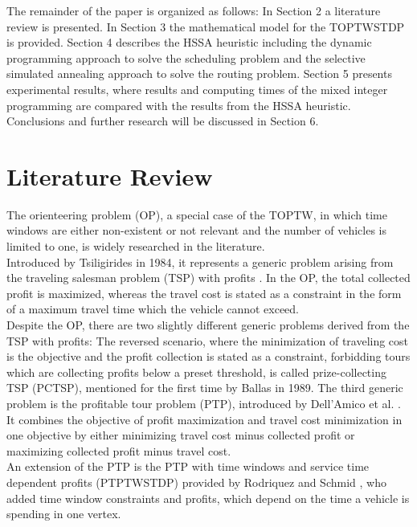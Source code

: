 \documentclass[final,5p,times,twocolumn]{elsarticle}
\begin{document}
The remainder of the paper is organized as follows: In Section 2 a literature review is presented. In Section 3 the mathematical model for the TOPTWSTDP is provided. Section 4 describes the HSSA heuristic including the dynamic programming approach to solve the scheduling problem and the selective simulated annealing approach to solve the routing problem. Section 5 presents experimental results, where results and computing times of the mixed integer programming are compared with the results from the HSSA heuristic. Conclusions and further research will be discussed in Section 6. \\

\section{Literature Review}
The orienteering problem (OP), a special case of the TOPTW, in which time windows are either non-existent or not relevant and the number of vehicles is limited to one, is widely researched in the literature. \\
Introduced by Tsiligirides \cite{Tsiligirides:1984hmao} in 1984, it represents a generic problem arising from the traveling salesman problem (TSP) with profits \cite{Feillet:2005tspwp}. In the OP, the total collected profit is maximized, whereas the travel cost is stated as a constraint in the form of a maximum travel time which the vehicle cannot exceed. \\
Despite the OP, there are two slightly different generic problems derived from the TSP with profits: The reversed scenario, where the minimization of traveling cost is the objective and the profit collection is stated as a constraint, forbidding tours which are collecting profits below a preset threshold, is called prize-collecting TSP (PCTSP), mentioned for the first time by Ballas \cite{Ballas:1989pctsp} in 1989. The third generic problem is the profitable tour problem (PTP), introduced by Dell'Amico et al. \cite{DellAmico:1995pct}. It combines the objective of profit maximization and travel cost minimization in one objective by either minimizing travel cost minus collected profit or maximizing collected profit minus travel cost.\\
An extension of the PTP is the PTP with time windows and service time dependent profits (PTPTWSTDP) provided by Rodriquez and Schmid \cite{Rodriguez:2013}, who added time window constraints and profits, which depend on the time a vehicle is spending in one vertex.\\
\end{document}
